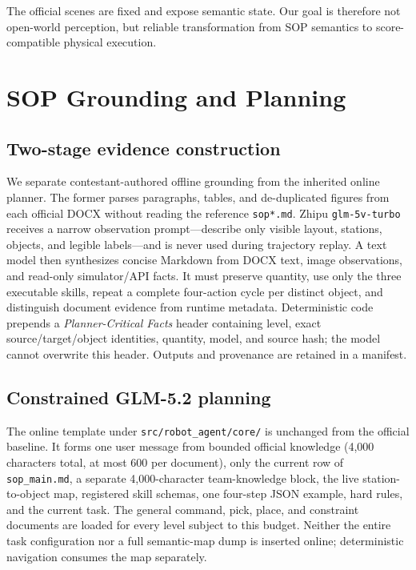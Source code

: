 \documentclass[10pt,twocolumn]{article}
\newcommand{\code}[1]{\texttt{#1}}
\begin{document}
The official scenes are fixed and expose semantic state. Our goal is therefore not open-world perception, but reliable transformation from SOP semantics to score-compatible physical execution.

\section{SOP Grounding and Planning}

\subsection{Two-stage evidence construction}

We separate contestant-authored offline grounding from the inherited online planner. The former parses paragraphs, tables, and de-duplicated figures from each official DOCX without reading the reference \code{sop*.md}. Zhipu \code{glm-5v-turbo} receives a narrow observation prompt---describe only visible layout, stations, objects, and legible labels---and is never used during trajectory replay. A text model then synthesizes concise Markdown from DOCX text, image observations, and read-only simulator/API facts. It must preserve quantity, use only the three executable skills, repeat a complete four-action cycle per distinct object, and distinguish document evidence from runtime metadata. Deterministic code prepends a \emph{Planner-Critical Facts} header containing level, exact source/target/object identities, quantity, model, and source hash; the model cannot overwrite this header. Outputs and provenance are retained in a manifest.

\subsection{Constrained GLM-5.2 planning}

The online template under \code{src/robot\_agent/core/} is unchanged from the official baseline. It forms one user message from bounded official knowledge (4,000 characters total, at most 600 per document), only the current row of \code{sop\_main.md}, a separate 4,000-character team-knowledge block, the live station-to-object map, registered skill schemas, one four-step JSON example, hard rules, and the current task. The general command, pick, place, and constraint documents are loaded for every level subject to this budget. Neither the entire task configuration nor a full semantic-map dump is inserted online; deterministic navigation consumes the map separately.
\end{document}
